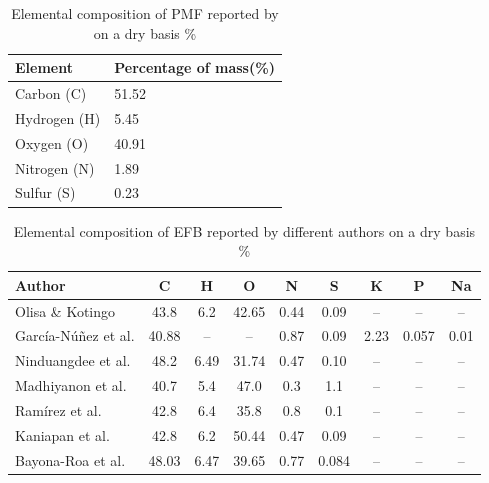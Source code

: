 \documentclass[preprint,12pt]{elsarticle}
\begin{document}
\begin{table}[H]
\begin{center}
\caption{Elemental composition of PMF reported by \cite{Idris2012} on a dry basis \%}
\label{tabla:compPalmiste}
\begin{tabular*}{6cm}{l p{3cm}} \hline
\textbf{Element} & \textbf{Percentage of mass(\%)} \\ \hline
Carbon (C) & 51.52 \\
Hydrogen (H) & 5.45 \\
Oxygen (O) & 40.91 \\
Nitrogen (N) & 1.89 \\
Sulfur (S) & 0.23 \\ \hline
\end{tabular*}
\end{center}
\end{table}


\begin{table}[H]
\centering
\caption{Elemental composition of EFB reported by different authors on a dry basis \%}
\label{tab:composition2_transposed}
\renewcommand{\arraystretch}{1.2}
\small
\begin{tabularx}{\textwidth}{lcccccccc}
\hline
\textbf{Author} & \textbf{C} & \textbf{H} & \textbf{O} & \textbf{N} & \textbf{S} & \textbf{K} & \textbf{P} & \textbf{Na} \\
\hline
Olisa \& Kotingo \cite{Olisa2014}         & 43.8  & 6.2   & 42.65 & 0.44 & 0.09  & --   & --     & --    \\
García-Núñez et al. \cite{GarciaNunez2006} & 40.88 & --    & --    & 0.87 & 0.09  & 2.23 & 0.057  & 0.01 \\
Ninduangdee et al. \cite{Ninduangdee2015}  & 48.2  & 6.49  & 31.74 & 0.47 & 0.10  & --   & --     & --    \\
Madhiyanon et al. \cite{Madhiyanon2012}    & 40.7  & 5.4   & 47.0  & 0.3  & 1.1   & --   & --     & --    \\
Ramírez et al. \cite{Ramirez2011}          & 42.8  & 6.4   & 35.8  & 0.8  & 0.1   & --   & --     & --    \\
Kaniapan et al. \cite{Kaniapan2021}        & 42.8  & 6.2   & 50.44 & 0.47 & 0.09  & --   & --     & --    \\
Bayona-Roa et al. \cite{BayonaRaquis}      & 48.03 & 6.47  & 39.65 & 0.77 & 0.084 & --   & --     & --    \\
\hline
\end{tabularx}
\end{table}
\end{document}
